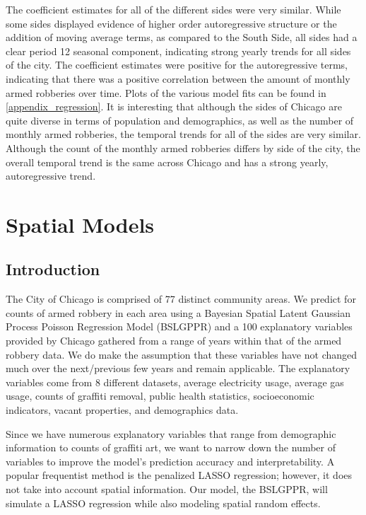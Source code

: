 \documentclass{article} %
\begin{document}
\noindent The coefficient estimates for all of the different sides were very similar.  While some sides displayed evidence of higher order autoregressive structure or the addition of moving average terms, as compared to the South Side, all sides had a clear period 12 seasonal component, indicating strong yearly trends for all sides of the city.  The coefficient estimates were positive for the autoregressive terms, indicating that there was a positive correlation between the amount of monthly armed robberies over time.  Plots of the various model fits can be found in \autoref{appendix_regression}.  It is interesting that although the sides of Chicago are quite diverse in terms of population and demographics, as well as the number of monthly armed robberies, the temporal trends for all of the sides are very similar.  Although the count of the monthly armed robberies differs by side of the city, the overall temporal trend is the same across Chicago and has a strong yearly, autoregressive trend.\newline   


\section{Spatial Models}


\subsection{Introduction}

The City of Chicago is comprised of 77 distinct community areas. We predict for counts of armed robbery in each area using a Bayesian Spatial Latent Gaussian Process Poisson Regression Model (BSLGPPR) and a 100 explanatory variables provided by Chicago gathered from a range of years within that of the armed robbery data. We do make the assumption that these variables have not changed much over the next/previous few years and remain applicable. The explanatory variables come from 8 different datasets, average electricity usage, average gas usage, counts of graffiti removal, public health statistics, socioeconomic indicators, vacant properties, and demographics data. 

Since we have numerous explanatory variables that range from demographic information to counts of graffiti art, we want to narrow down the number of variables to improve the model's prediction accuracy and interpretability.  A popular frequentist method is the penalized LASSO regression; however, it does not take into account spatial information. Our model, the BSLGPPR, will simulate a LASSO regression while also modeling spatial random effects. 
\end{document}
